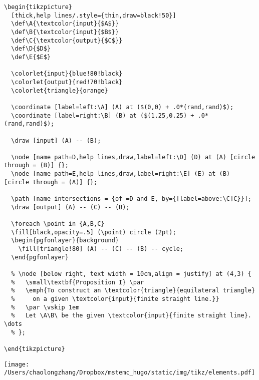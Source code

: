 \documentclass[koma,a4paper,utopia,12pt,listings-color,microtype,paralist,colorlinks,urlcolor=red]{org-article}
\begin{document}
\begin{lstlisting}
\begin{tikzpicture}
  [thick,help lines/.style={thin,draw=black!50}]
  \def\A{\textcolor{input}{$A$}}
  \def\B{\textcolor{input}{$B$}}
  \def\C{\textcolor{output}{$C$}}
  \def\D{$D$}
  \def\E{$E$}

  \colorlet{input}{blue!80!black}
  \colorlet{output}{red!70!black}
  \colorlet{triangle}{orange}

  \coordinate [label=left:\A] (A) at ($(0,0) + .0*(rand,rand)$);
  \coordinate [label=right:\B] (B) at ($(1.25,0.25) + .0*(rand,rand)$);

  \draw [input] (A) -- (B);

  \node [name path=D,help lines,draw,label=left:\D] (D) at (A) [circle through = (B)] {};
  \node [name path=E,help lines,draw,label=right:\E] (E) at (B) [circle through = (A)] {};

  \path [name intersections = {of =D and E, by={[label=above:\C]C}}];
  \draw [output] (A) -- (C) -- (B);

  \foreach \point in {A,B,C}
  \fill[black,opacity=.5] (\point) circle (2pt);
  \begin{pgfonlayer}{background}
    \fill[triangle!80] (A) -- (C) -- (B) -- cycle;
  \end{pgfonlayer}

  % \node [below right, text width = 10cm,align = justify] at (4,3) {
  %   \small\textbf{Proposition I} \par
  %   \emph{To construct an \textcolor{triangle}{equilateral triangle}
  %     on a given \textcolor{input}{finite straight line.}}
  %   \par \vskip 1em
  %   Let \A\B\ be the given \textcolor{input}{finite straight line}. \dots
  % };

\end{tikzpicture}
\end{lstlisting}


\begin{center}
\texttt{[image: /Users/chaolongzhang/Dropbox/mstemc\_hugo/static/img/tikz/elements.pdf]}
\end{center}
\end{document}
